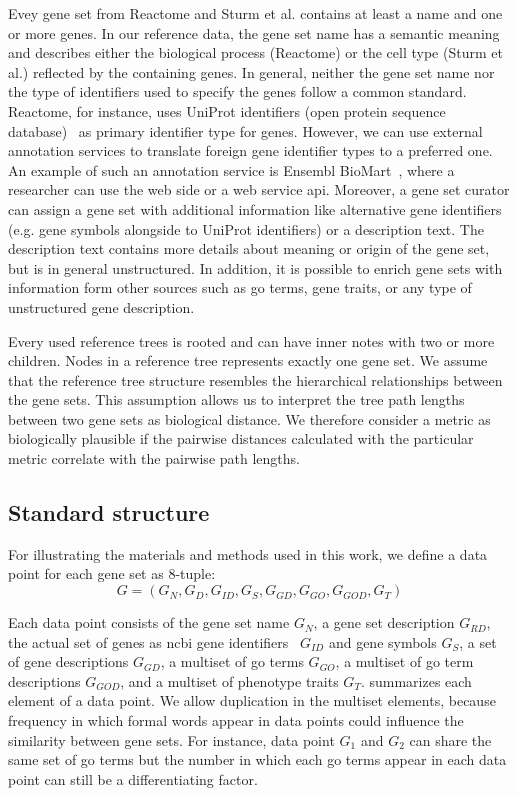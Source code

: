 \documentclass{thesisclass}
\begin{document}
Evey gene set from Reactome and Sturm et al. contains at least a name and one or more genes. In our reference data, the gene set name has a semantic meaning and describes either the biological process (Reactome) or the cell type (Sturm et al.) reflected by the containing genes.
In general, neither the gene set name nor the type of identifiers used to specify the genes follow a common standard.
Reactome, for instance, uses UniProt identifiers (open protein sequence database)~\cite{doi:10.1093/nar/gkw1099} as primary identifier type for genes. 
However, we can use external annotation services to translate foreign gene identifier types to a preferred one. An example of such an annotation service is Ensembl BioMart~\cite{doi:10.1093/nar/gkx1098}, where a researcher can use the web side or a web service \acrshort{api}. 
Moreover, a gene set curator can assign a gene set with additional information like alternative gene identifiers (e.g. gene symbols alongside to UniProt identifiers) or a description text. The description text contains more details about meaning or origin of the gene set, but is in general unstructured. 
In addition, it is possible to enrich gene sets with information form other sources such as \acrshort{go} terms, gene traits, or any type of unstructured gene description. 

Every used reference trees is rooted and can have inner notes with two or more children. 
Nodes in a reference tree represents exactly one gene set. 
We assume that the reference tree structure resembles the hierarchical relationships between the gene sets. 
This assumption allows us to interpret the tree path lengths between two gene sets as biological distance. 
We therefore consider a metric as biologically plausible if the pairwise distances calculated with the particular metric correlate with the pairwise path lengths.

\subsection{Standard structure} \label{sec:gs_def}

For illustrating the materials and methods used in this work, we define a data point for each gene set as 8-tuple:
\begin{equation} \label{eq:gs_info}
G= \left(G_N, G_{D}, G_{ID}, G_S, G_{GD}, G_{GO}, G_{GOD}, G_{T} \right)
\end{equation}

Each data point consists of the gene set name $G_N$, a gene set description $G_{RD}$, the actual set of genes as \acrshort{ncbi} gene identifiers~\cite{doi:10.1093/nar/gkl993} $G_{ID}$ and gene symbols $G_S$, a set of gene descriptions $G_{GD}$, a multiset of \acrshort{go} terms $G_{GO}$, a multiset of \acrshort{go} term descriptions $G_{GOD}$, and a multiset of phenotype traits $G_{T}$.
 summarizes each element of a data point.
We allow duplication in the multiset elements, because frequency in which formal words appear in data points could influence the similarity between gene sets. 
For instance, data point $G_1$ and $G_2$ can share the same set of \acrshort{go} terms but the number in which each \acrshort{go} terms appear in each data point can still be a differentiating factor.
\end{document}
